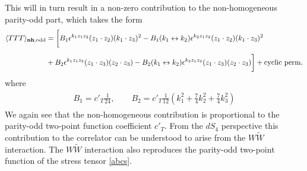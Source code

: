 \documentclass[a4paper,11pt]{article}
\begin{document}
This will in turn result in a non-zero contribution to the non-homogeneous parity-odd part, which takes the form 
\begin{align}\label{tttnewbasis}
\begin{split}
\langle TTT \rangle_{\bf{nh},\text{odd}} &= \bigg[B_1 \epsilon^{k_1 z_1 z_2} (z_1 \cdot z_2) (k_1 \cdot z_3)^2 - B_1 (k_1 \leftrightarrow k_2)\epsilon^{k_2 z_1 z_2} (z_1 \cdot z_2) (k_1 \cdot z_3)^2\bigg.\\[5 pt]
&\bigg.+B_2 \epsilon^{k_1 z_1 z_2} (z_1 \cdot z_3) (z_2 \cdot z_3)-B_2(k_1 \leftrightarrow k_2)\epsilon^{k_2 z_1 z_2} (z_1 \cdot z_3) (z_2 \cdot z_3)\bigg] + \text{cyclic perm.}
\end{split}
\end{align}
where
\begin{align}
\begin{split}
B_1=c'_T \frac{1}{24},\quad\quad
B_2 = c'_T \frac{1}{12}\left(k_1^2 + \frac{7}{4} k_2^2+ \frac{7}{4} k_3^2\right)
\end{split}
\end{align}
We again see that the non-homogeneous contribution is proportional to the parity-odd two-point function coefficient $c'_{T}$. From the $dS_4$ perspective this contribution to the correlator can be understood to arise from the $W\widetilde W$ interaction. The $W\widetilde W$  interaction also reproduces the  parity-odd two-point function of the stress tensor \eqref{abcs}. 



\providecommand{\href}[2]{#2}\begingroup\raggedright


\endgroup

%
\end{document}
